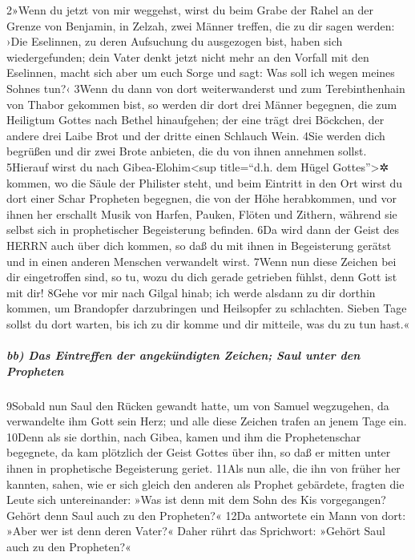 2»Wenn du jetzt von mir weggehst, wirst du beim Grabe der Rahel an der
Grenze von Benjamin, in Zelzah, zwei Männer treffen, die zu dir sagen
werden: ›Die Eselinnen, zu deren Aufsuchung du ausgezogen bist, haben
sich wiedergefunden; dein Vater denkt jetzt nicht mehr an den Vorfall
mit den Eselinnen, macht sich aber um euch Sorge und sagt: Was soll ich
wegen meines Sohnes tun?‹ 3Wenn du dann von dort weiterwanderst und zum
Terebinthenhain von Thabor gekommen bist, so werden dir dort drei Männer
begegnen, die zum Heiligtum Gottes nach Bethel hinaufgehen; der eine
trägt drei Böckchen, der andere drei Laibe Brot und der dritte einen
Schlauch Wein. 4Sie werden dich begrüßen und dir zwei Brote anbieten,
die du von ihnen annehmen sollst. 5Hierauf wirst du nach
Gibea-Elohim\textless sup title=``d.h. dem Hügel Gottes''\textgreater✲
kommen, wo die Säule der Philister steht, und beim Eintritt in den Ort
wirst du dort einer Schar Propheten begegnen, die von der Höhe
herabkommen, und vor ihnen her erschallt Musik von Harfen, Pauken,
Flöten und Zithern, während sie selbst sich in prophetischer
Begeisterung befinden. 6Da wird dann der Geist des HERRN auch über dich
kommen, so daß du mit ihnen in Begeisterung gerätst und in einen anderen
Menschen verwandelt wirst. 7Wenn nun diese Zeichen bei dir eingetroffen
sind, so tu, wozu du dich gerade getrieben fühlst, denn Gott ist mit
dir! 8Gehe vor mir nach Gilgal hinab; ich werde alsdann zu dir dorthin
kommen, um Brandopfer darzubringen und Heilsopfer zu schlachten. Sieben
Tage sollst du dort warten, bis ich zu dir komme und dir mitteile, was
du zu tun hast.«

\hypertarget{bb-das-eintreffen-der-angekuxfcndigten-zeichen-saul-unter-den-propheten}{%
\subparagraph{bb) Das Eintreffen der angekündigten Zeichen; Saul unter
den
Propheten}\label{bb-das-eintreffen-der-angekuxfcndigten-zeichen-saul-unter-den-propheten}}

9Sobald nun Saul den Rücken gewandt hatte, um von Samuel wegzugehen, da
verwandelte ihm Gott sein Herz; und alle diese Zeichen trafen an jenem
Tage ein. 10Denn als sie dorthin, nach Gibea, kamen und ihm die
Prophetenschar begegnete, da kam plötzlich der Geist Gottes über ihn, so
daß er mitten unter ihnen in prophetische Begeisterung geriet. 11Als nun
alle, die ihn von früher her kannten, sahen, wie er sich gleich den
anderen als Prophet gebärdete, fragten die Leute sich untereinander:
»Was ist denn mit dem Sohn des Kis vorgegangen? Gehört denn Saul auch zu
den Propheten?« 12Da antwortete ein Mann von dort: »Aber wer ist denn
deren Vater?« Daher rührt das Sprichwort: »Gehört Saul auch zu den
Propheten?«

